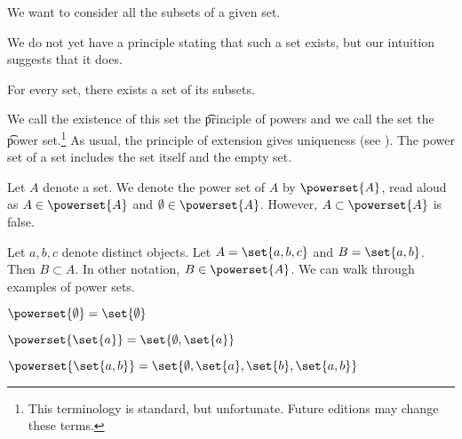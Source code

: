 

We want to consider all the subsets of a given set.


We do not yet have a principle stating that such a set exists, but our intuition suggests that it does.

\begin{principle}[Powers]
  For every set, there exists a set of its subsets.
\end{principle}

We call the existence of this set the \t{principle of powers} and we call the set the \t{power set}.\footnote{This terminology is standard, but unfortunate. Future editions may change these terms.}
As usual, the principle of extension gives uniqueness (see ).
The power set of a set includes the set itself and the empty set.


Let $A$ denote a set.
We denote the power set of $A$ by $\powerset{A}$, read aloud as 
$A \in \powerset{A}$ and $\emptyset \in \powerset{A}$.
However, $A \subset \powerset{A}$ is false.


Let $a, b, c$ denote distinct objects. Let $A = \set{a, b ,c}$
and $B = \set{a, b}$. Then
$B \subset A$.
In other notation,
$B \in \powerset{A}$.
We can walk through examples of power sets.


\begin{proposition}
  $\powerset{\emptyset} = \set{\emptyset}$
\end{proposition}


\begin{proposition}
  $\powerset{\set{a}} = \set{\emptyset, \set{a}}$
\end{proposition}


\begin{proposition}
  $\powerset{\set{a, b}} = \set{\emptyset, \set{a}, \set{b}, \set{a, b}}$
\end{proposition}

